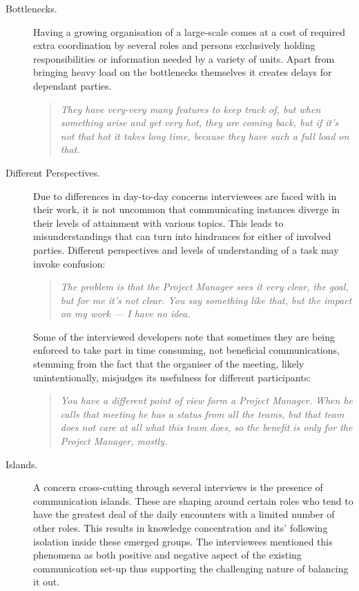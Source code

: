 \begin{description}

   \item[Bottlenecks.] Having a growing organisation of a large-scale comes at a cost of required extra coordination by several roles and persons exclusively holding responsibilities or information needed by a variety of units. Apart from bringing heavy load on the bottlenecks themselves it creates delays for dependant parties.
   
      \begin{quote}\itshape They have very-very many features to keep track of, but when something arise and get very hot, they are coming back, but if it's not that hot it takes long time, because they have such a full load on that.
      \end{quote}

   \item[Different Perspectives.] Due to differences in day-to-day concerns interviewees are faced with in their work, it is not uncommon that communicating instances diverge in their levels of attainment with various topics. This leads to misunderstandings that can turn into hindrances for either of involved parties. Different perspectives and levels of understanding of a task may invoke confusion:

      \begin{quote}\itshape %
      The problem is that the Project Manager sees it very clear, the goal, but for me it’s not clear. You say something like that, but the impact on my work — I have no idea.
      \end{quote}
      
   Some of the interviewed developers note that sometimes they are being enforced to take part in time consuming, not beneficial communications, stemming from the fact that the organiser of the meeting, likely unintentionally, misjudges its usefulness for different participants:

      \begin{quote}\itshape You have a different point of view form a Project Manager. When he calls that meeting he has a status from all the teams, but that team does not care at all what this team does, so the benefit is only for the Project Manager, mostly.
      \end{quote}

   \item[Islands.] A concern cross-cutting through several interviews is the presence of communication islands. These are shaping around certain roles who tend to have the greatest deal of the daily encounters with a limited number of other roles. This results in knowledge concentration and its' following isolation inside these emerged groups. The interviewees mentioned this phenomena as both positive and negative aspect of the existing communication set-up thus supporting the challenging nature of balancing it out.
   

\end{description}
